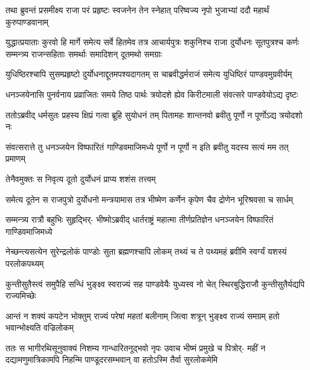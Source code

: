 \fourlineindentedshloka
{तथा ब्रुवन्तं प्रसमीक्ष्य राजा}
{परं प्रहृष्टः स्वजनेन तेन}
{स्नेहात् परिष्वज्य नृपो भुजाभ्यां}
{ददौ महार्थं कुरुपाण्डवानाम्}


\sixlineindentedshloka
{युद्धात्प्रयाताः कुरवो हि मार्गे}
{समेत्य सर्वे हितमेव तत्र}
{आचार्यपुत्रः शकुनिश्च राजा}
{दुर्योधनः सूतपुत्रश्च कर्णः}
{सम्मन्त्र्य राजन्सहिताः समर्थाः}
{समादिशन् दूतमथो समग्राः}


\fourlineindentedshloka
{युधिष्ठिरश्चापि सुसम्प्रहृष्टो}
{दुर्योधनाद्दूतमपश्यदागतम्}
{स चाब्रवीद्धर्मराजं समेत्य}
{युधिष्ठिरं पाण्डवमुग्रवीर्यम्}


\fourlineindentedshloka
{धनञ्जयेनासि पुनर्वनाय}
{प्रव्राजितः समये तिष्ठ पार्थः}
{त्रयोदशे ह्येव किरीटमाली}
{संवत्सरे पाण्डवेयोऽद्य दृष्टः}



\fourlineindentedshloka
{ततोऽब्रवीद् धर्मसुतः प्रहस्य}
{क्षिप्रं गत्वा ब्रूहि सुयोधनं तम्}
{पितामहः शान्तनवो ब्रवीतु}
{पूर्णो न पूर्णोऽद्य त्रयोदशो नः}


\fourlineindentedshloka
{संवत्सरात्ते तु धनञ्जयेन}
{विष्फारितं गाण्डिवमाजिमध्ये}
{पूर्णो न पूर्णो न इति ब्रवीतु}
{यदस्य सत्यं मम तत् प्रमाणम्}


\onelineindentedshloka
{तेनैवमुक्तः स निवृत्य दूतो}
{दुर्योधनं प्राप्य शशंस तत्त्वम्}

\fourlineindentedshloka
{समेत्य दूतेन स राजपुत्रो}
{दुर्योधनो मन्त्रयामास तत्र}
{भीष्मेण कर्णेन कृपेण चैव}
{द्रोणेन भूरिश्रवसा च सार्धम्}


\fourlineindentedshloka
{सम्मन्त्र्य रात्रौ बहुभिः सुहृद्भिर्-}
{भीष्मोऽब्रवीद् धार्तराष्ट्रं महात्मा}
{तीर्णप्रतिज्ञेन धनञ्जयेन}
{विष्फारितं गाण्डिवमाजिमध्ये}



\fourlineindentedshloka
{नेच्छन्त्यसत्येन सुरेन्द्रलोकं}
{पाण्डोः सुता ब्रह्मणश्चापि लोकम्}
{तथ्यं च ते पथ्यमहं ब्रवीमि}
{स्वर्ग्यं यशस्यं परलोकपथ्यम्}


\fourlineindentedshloka
{कुन्तीसुतैस्त्वं समुपैहि सन्धिं}
{भुङ्क्ष्व स्वराज्यं सह पाण्डवेयैः}
{युध्यस्व नो चेत् स्थिरबुद्धिराजौ}
{कुन्तीसुतैर्यद्यपि राज्यमिच्छेः}


\fourlineindentedshloka
{आन्तं न शक्यं कपटेन भोक्तुम्}
{राज्यं परेषां महतां बलीनाम्}
{जित्वा शत्रून् भुङ्क्ष्व राज्यं समग्रम्}
{हतो भवान्भोक्ष्यति वज्रिलोकम्}



\sixlineindentedshloka
{ततः स भागीरथिसूनुवाक्यं}
{निशम्य गान्धारितनूद्भवो नृपः}
{उवाच भीष्मं प्रमुखे च पित्रोर्-}
{महीं न दद्यामणुमात्रिकामपि}
{निहन्मि पाण्डूदरसम्भवान् वा}
{हतोऽस्मि तैर्वा सुरलोकमेमि}


